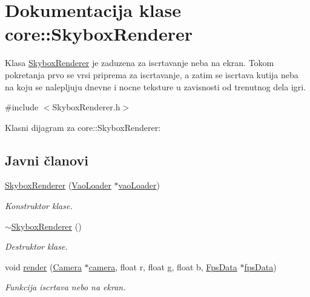 \hypertarget{classcore_1_1SkyboxRenderer}{}\section{Dokumentacija klase core\+:\+:Skybox\+Renderer}
\label{classcore_1_1SkyboxRenderer}


Klasa \hyperlink{classcore_1_1SkyboxRenderer}{Skybox\+Renderer} je zaduzena za iscrtavanje neba na ekran. Tokom pokretanja prvo se vrsi priprema za iscrtavanje, a zatim se iscrtava kutija neba na koju se nalepljuju dnevne i nocne teksture u zavisnosti od trenutnog dela igri.  




{\ttfamily \#include $<$Skybox\+Renderer.\+h$>$}



Klasni dijagram za core\+:\+:Skybox\+Renderer\+:
\subsection*{Javni članovi}
\begin{DoxyCompactItemize}
\item 
\hyperlink{classcore_1_1SkyboxRenderer_a2b7e44e90391374f8583c2143a6b1e25}{Skybox\+Renderer} (\hyperlink{classcore_1_1VaoLoader}{Vao\+Loader} $\ast$\hyperlink{namespacecore_a78dd24784c415d3759a0f71b8f4f9f81}{vao\+Loader})
\begin{DoxyCompactList}\small\item\em Konstruktor klase. \end{DoxyCompactList}\item 
\hyperlink{classcore_1_1SkyboxRenderer_aa2c93db248d8df20a05823139e8751a7}{$\sim$\+Skybox\+Renderer} ()
\begin{DoxyCompactList}\small\item\em Destruktor klase. \end{DoxyCompactList}\item 
void \hyperlink{classcore_1_1SkyboxRenderer_a6ab6906aa0c5ff7931088a0ddd52e4c6}{render} (\hyperlink{classentity_1_1Camera}{Camera} $\ast$\hyperlink{namespacecore_a9d645c490b142886301256f6cf9c65c2}{camera}, float r, float g, float b, \hyperlink{classutility_1_1FpsData}{Fps\+Data} $\ast$\hyperlink{namespacecore_a5d5106eb67b679c9260ebe0a9faf14db}{fps\+Data})
\begin{DoxyCompactList}\small\item\em Funkcija iscrtava nebo na ekran. \end{DoxyCompactList}\end{DoxyCompactItemize}
